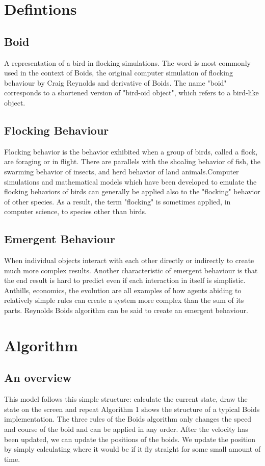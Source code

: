 \documentclass[12pt]{article}
\begin{document}
\section{Defintions}

\subsection{Boid}
A representation of a bird in flocking simulations. The word is most commonly used in the context of Boids, the original computer simulation of flocking behaviour by Craig Reynolds and derivative of Boids. The name "boid" corresponds to a shortened version of "bird-oid object", which refers to a bird-like object.

\subsection{Flocking Behaviour}
Flocking behavior is the behavior exhibited when a group of birds, called a flock, are foraging or in flight. There are parallels with the shoaling behavior of fish, the swarming behavior of insects, and herd behavior of land animals.Computer simulations and mathematical models which have been developed to emulate the flocking behaviors of birds can generally be applied also to the "flocking" behavior of other species. As a result, the term "flocking" is sometimes applied, in computer science, to species other than birds.

\subsection{Emergent Behaviour}
When individual objects interact with each other directly or indirectly to create much more complex results. Another characteristic of emergent behaviour is that the end result is hard to predict even if each interaction in itself is simplistic. Anthills, economics, the evolution are all examples of how agents abiding to relatively simple rules can create a system more complex than the sum of its parts. Reynolds Boids algorithm can be said to create an emergent behaviour.

\section{Algorithm}

\subsection{An overview}
This model follows this simple structure: calculate the current state, draw the state on the screen and repeat Algorithm 1 shows the structure of a typical Boids implementation. The three rules of the Boids algorithm only changes the speed and course of the boid and can be applied in any order. After the velocity has been updated, we can update the positions of the boids. We update the position by simply calculating where it would be if it fly straight for some small amount of time.
\end{document}
